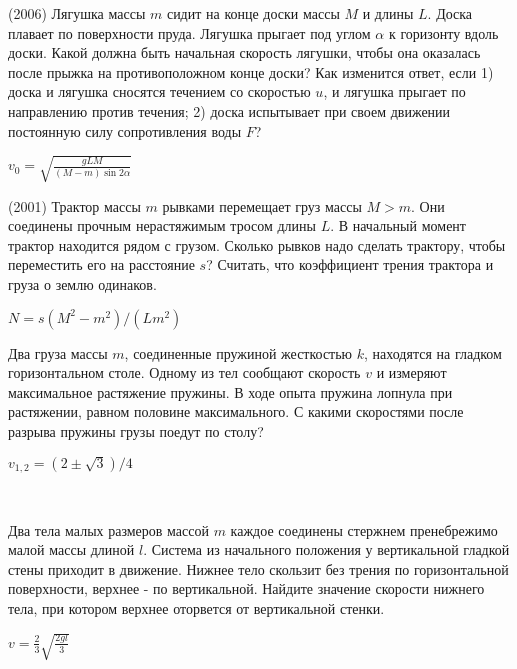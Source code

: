 \begin{ex}
(2006) Лягушка массы $m$ сидит на конце доски массы $M$ и длины $L$. Доска плавает по поверхности пруда. Лягушка прыгает под углом $\alpha$ к горизонту вдоль доски. Какой должна быть начальная скорость лягушки, чтобы она оказалась после прыжка на противоположном конце доски? Как изменится ответ, если 1) доска и лягушка сносятся течением со скоростью $u$, и лягушка прыгает по направлению против течения; 2) доска испытывает при своем движении постоянную силу сопротивления воды $F$?
\begin{ans}
$v_0 = \sqrt{\frac{gLM}{(M-m) \sin 2\alpha}}$
\end{ans}
\end{ex}

\begin{ex}
(2001) Трактор массы $m$ рывками перемещает груз массы $M>m$. Они соединены прочным нерастяжимым тросом длины $L$. В начальный момент трактор находится рядом с грузом. Сколько рывков надо сделать трактору, чтобы переместить его на расстояние $s$?  Считать, что коэффициент трения трактора и груза о землю одинаков.
\begin{ans}
$N = s(M^2-m^2)/(Lm^2)$
\end{ans}
\end{ex}

\begin{ex}
Два груза массы $m$, соединенные пружиной жесткостью $k$, находятся на гладком горизонтальном столе. Одному из тел сообщают скорость $v$ и измеряют максимальное растяжение пружины. В ходе опыта пружина лопнула при растяжении, равном половине максимального. С какими скоростями после разрыва пружины грузы поедут по столу?
\begin{ans}
$v_{1,2} = (2\pm \sqrt{3})/4$
\end{ans}
\end{ex}

\begin{ex}
\hspace{0pt} \\
\begin{minipage}{.65\textwidth}
Два тела малых размеров массой $m$ каждое соединены стержнем пренебрежимо малой массы длиной $l$. Система из начального положения у вертикальной гладкой стены приходит в движение. Нижнее тело скользит без трения по горизонтальной поверхности, верхнее - по вертикальной. Найдите значение скорости нижнего тела, при котором верхнее оторвется от вертикальной стенки.
\end{minipage}
\begin{minipage}{.35\textwidth}
\centering

\end{minipage}
\begin{ans}
$v = \frac{2}{3}\sqrt{\frac{2gl}{3}}$
\end{ans}
\end{ex}

